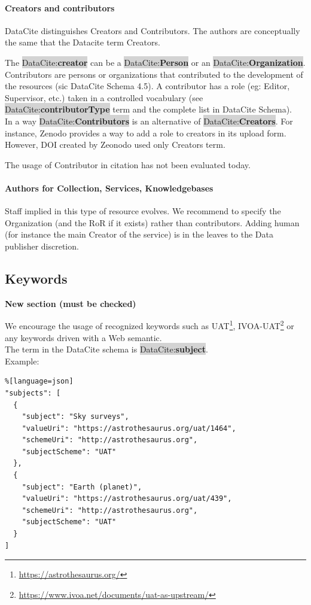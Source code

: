 \documentclass[11pt,a4paper]{ivoa}
\newcommand{\dataciteterm}[1]{\colorbox{lightgray}{DataCite:\textbf{#1}}}
\begin{document}
\paragraph{Creators and contributors}
DataCite distinguishes Creators and Contributors. The authors are conceptually the same that the Datacite term Creators.

The \dataciteterm{creator} can be a \dataciteterm{Person} or an \dataciteterm{Organization}.
Contributors are persons or organizations that contributed to the development of the resources (sic DataCite Schema 4.5).
A contributor has a role (eg: Editor, Supervisor, etc.) taken in a controlled vocabulary (see \dataciteterm{contributorType} term and the complete list in DataCite Schema).\\

In a way \dataciteterm{Contributors} is an alternative of \dataciteterm{Creators}. For instance, Zenodo provides a way to add a role to creators in its upload form. However, DOI created by Zeonodo used only Creators term.

The usage of Contributor in citation has not been evaluated today.


\paragraph{Authors for Collection, Services, Knowledgebases}
Staff implied in this type of resource evolves. We recommend to specify the Organization (and the RoR if it exists) rather than contributors. Adding human (for instance the main Creator of the service) is in the leaves to the Data publisher discretion.

\subsection{Keywords}
\label{sec:keywords}
\textbf{\color{red}New section (must be checked)}

We encourage the usage of recognized keywords such as UAT\footnote{\url{https://astrothesaurus.org/}}, IVOA-UAT\footnote{\url{https://www.ivoa.net/documents/uat-as-upstream/}} or any keywords driven with a Web semantic.\\

The term in the DataCite schema is \dataciteterm{subject}.\\

Example:\\
\begin{lstlisting}%[language=json]
"subjects": [
  {
    "subject": "Sky surveys",
    "valueUri": "https://astrothesaurus.org/uat/1464",
    "schemeUri": "http://astrothesaurus.org",
    "subjectScheme": "UAT"
  },
  {
    "subject": "Earth (planet)",
    "valueUri": "https://astrothesaurus.org/uat/439",
    "schemeUri": "http://astrothesaurus.org",
    "subjectScheme": "UAT"
  }
]

\end{lstlisting}
\end{document}
